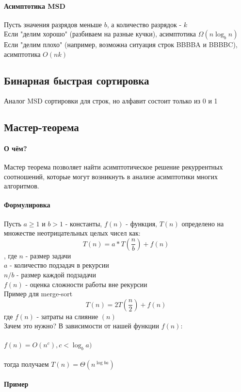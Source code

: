 \documentclass[a4paper,10pt]{article}
\begin{document}
	\paragraph{Асимптотика MSD}
	Пусть значения разрядов меньше $b$, а количество разрядок - $k$ \\
	Если "делим хорошо" (разбиваем на разные кучки), асимптотика $\Omega(n\log_{b}n)$ \\
	Если "делим плохо" (например, возможна ситуация строк BBBBA и BBBBC), асимптотика $O(nk)$ \\
	\subsection{Бинарная быстрая сортировка}
	Аналог MSD сортировки для строк, но алфавит состоит только из 0 и 1 
	\subsection{Мастер-теорема}
	\paragraph{О чём?} Мастер теорема позволяет найти асимптотическое решение рекуррентных соотношений, которые могут возникнуть в анализе асимптотики многих алгоритмов.
	\paragraph{Формулировка} Пусть  $a \geq 1$ и $b > 1$ - константы, $f(n)$ - функция, $T(n)$ определено на множестве неотрицательных целых чисел как: 
	\[
		T(n) = a*T(\frac{n}{b}) + f(n)
	\], где $n$ - размер задачи \\
	$a$ - количество подзадач в рекурсии \\
	$n/b$ - размер каждой подзадачи \\
	$f(n)$ - оценка сложности работы вне рекурсии \\
	Пример для merge-sort 
	\[	
		T(n) = 2T(\frac{n}{2}) + f(n)
	\]	
	где $f(n)$ - затраты на слияние $(n)$\\
	
	Зачем это нужно? В зависимости от нашей функции $f(n)$:
	\paragraph{$f(n) = O(n^{c}), c < \log_{b} a)$} тогда получаем $T(n) = \Theta(n^{\log{b}a})$
	\paragraph{Пример}
	
\end{document}
